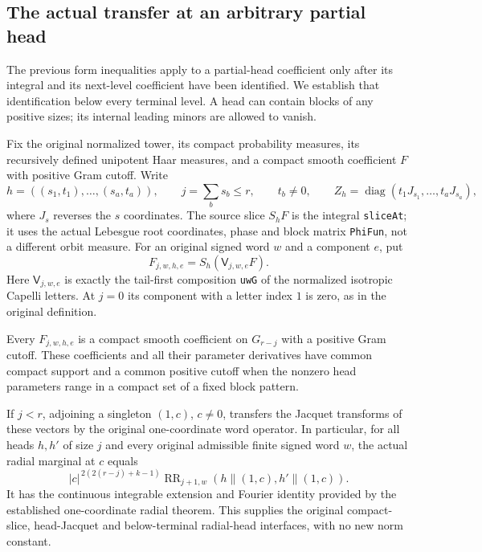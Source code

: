 \subsection{The actual transfer at an arbitrary partial head}
\label{actual-partial-head-transfer}

The previous form inequalities apply to a partial-head coefficient
only after its integral and its next-level coefficient have been
identified.  We establish that identification below every terminal
level.  A head can contain blocks of any positive sizes; its internal
leading minors are allowed to vanish.

Fix the original normalized tower, its compact probability measures,
its recursively defined unipotent Haar measures, and a compact smooth
coefficient $F$ with positive Gram cutoff.  Write
\[
 h=((s_1,t_1),\ldots,(s_a,t_a)),\qquad
 j=\sum_b s_b\le r,\qquad t_b\ne0,
 \qquad Z_h=\operatorname{diag}(t_1J_{s_1},\ldots,t_aJ_{s_a}),
\]
where $J_s$ reverses the $s$ coordinates.  The source slice
$S_hF$ is the integral \texttt{sliceAt}; it uses the actual
Lebesgue root coordinates, phase and block matrix
\texttt{PhiFun}, not a different orbit measure.
For an original signed word $w$ and a component $e$, put
\[
       F_{j,w,h,e}=S_h(\mathsf V_{j,w,e}F).
\]
Here $\mathsf V_{j,w,e}$ is exactly the tail-first composition
\texttt{uwG} of the normalized isotropic Capelli letters.
At $j=0$ its component with a letter index $1$ is zero,
as in the original definition.

\begin{theorem}\label{partial-head-transfer-actual}
Every $F_{j,w,h,e}$ is a compact smooth coefficient on $G_{r-j}$
with a positive Gram cutoff.  These coefficients and all their
parameter derivatives have common compact support and a common
positive cutoff when the nonzero head parameters range in a compact
set of a fixed block pattern.

If $j<r$, adjoining a singleton $(1,c)$, $c\ne0$, transfers the
Jacquet transforms of these vectors by the original one-coordinate
word operator.  In particular, for all heads $h,h'$ of size $j$
and every original admissible finite signed word $w$, the actual
radial marginal at $c$ equals
\begin{equation}\label{partial-head-density}
 |c|^{\,2(2(r-j)+k-1)}
    \operatorname{RR}_{j+1,w}
          (h\mathbin{\|}(1,c),h'\mathbin{\|}(1,c)).
\end{equation}
It has the continuous integrable extension and Fourier identity
provided by the established one-coordinate radial theorem.
This supplies the original compact-slice, head-Jacquet and
below-terminal radial-head interfaces, with no new norm constant.
\end{theorem}

